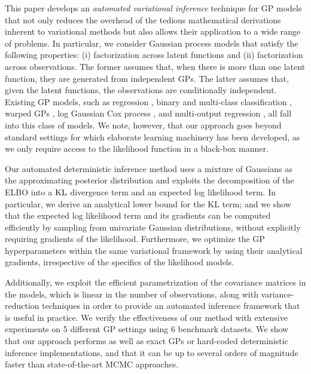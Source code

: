 This paper develops an \emph{automated variational inference} technique for  GP models  
that not only reduces the overhead  of the tedious mathematical 
derivations inherent to variational methods but also allows their application to a wide range of problems.
In particular, we consider Gaussian process models that satisfy the following properties:
(i)  factorization across latent functions  and 
(ii) factorization across observations.
The former assumes that, when there is more than one latent function, they are generated from  independent GPs. 
The latter assumes that, given  the latent functions,  the observations are  conditionally independent. 
Existing GP models, such as regression \cite{rasmussen-williams-book}, 
binary and multi-class classification \cite{nickisch2008approximations,williams1998bayesian}, 
warped GPs \cite{snelson2003warped}, log Gaussian Cox process \cite{moller1998log}, 
and multi-output regression \cite{wilson-et-al-icml-12}, all fall into  this class of models.
 We note, however, that our approach goes beyond standard  settings for 
 which elaborate learning machinery has been developed, 
 as we only require access to the likelihood function in a black-box manner.

Our automated deterministic inference method uses a mixture of Gaussians as the approximating 
posterior distribution and exploits the decomposition of the ELBO into a
  $\text{KL}$ divergence term         %
  and  an expected log likelihood term. 
In particular, we derive an analytical lower bound for the KL term;
and we show 
that the expected log likelihood term and its gradients can be computed efficiently 
by sampling from univariate Gaussian distributions, without explicitly requiring gradients of the likelihood. 
Furthermore, we optimize the GP hyperparameters within the same variational framework by using their analytical gradients, 
irrespective of the specifics of the likelihood models. 

Additionally, we exploit the efficient parametrization of the covariance matrices in the models,  
which is linear in the number of observations, along with 
variance-reduction techniques in order to provide an automated inference framework 
that is useful in practice. 
%
We verify the effectiveness of our method with extensive experiments on  5 different 
GP settings using 6 benchmark datasets. We show that our 
approach performs as well as exact  GPs or hard-coded deterministic inference 
implementations, and  that it 
can be up to several orders of  magnitude faster than  state-of-the-art 
MCMC approaches.
%
%
\vspace{-0.2cm}
